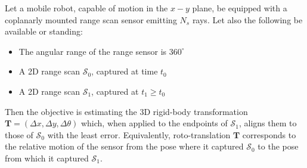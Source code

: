 \begin{problem}
  \label{prob:the_problem}
  Let a mobile robot, capable of motion in the $x-y$ plane, be equipped with a
  coplanarly mounted range scan sensor emitting $N_s$ rays. Let
  also the following be available or standing:
  \begin{itemize}
    \item The angular range of the range sensor is $360^\circ$
    \item A 2D range scan $\mathcal{S}_0$, captured at time $t_0$
    \item A 2D range scan $\mathcal{S}_1$, captured at $t_1 \geq t_0$
  \end{itemize}
\end{problem}
Then the objective is estimating the 3D rigid-body transformation
$\bm{T} = (\Delta x, \Delta y, \Delta \theta)$ which, when applied to the
endpoints of $\mathcal{S}_1$, aligns them to those of $\mathcal{S}_0$ with the
least error. Equivalently, roto-translation $\bm{T}$ corresponds to the
relative motion of the sensor from the pose where it captured $\mathcal{S}_0$
to the pose from which it captured $\mathcal{S}_1$.
